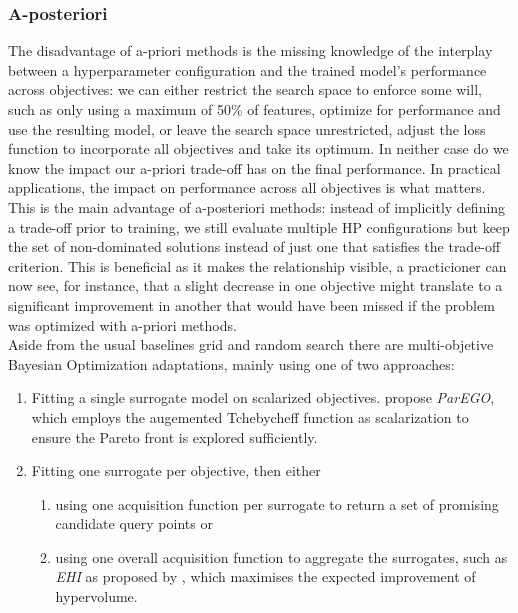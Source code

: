 \documentclass[twoside,11pt]{article}
\begin{document}
\subsubsection{A-posteriori}
\label{sec-moo-post}
The disadvantage of a-priori methods is the missing knowledge of the interplay between a hyperparameter configuration and the trained model's
performance across objectives:
we can either restrict the search space to enforce some will, such as only using a maximum of 50\% of features, optimize for performance and use the
resulting model, or leave the search space unrestricted, adjust the loss function to incorporate all objectives and take its optimum.
In neither case do we know the impact our a-priori trade-off has on the final performance.
In practical applications, the impact on performance across all objectives is what matters.
This is the main advantage of a-posteriori methods: instead of implicitly defining a trade-off prior to training, we still evaluate multiple HP configurations
but keep the set of non-dominated solutions instead of just one that satisfies the trade-off criterion.
This is beneficial as it makes the relationship visible, a practicioner can now see, for instance, that a slight decrease in one objective might translate to
a significant improvement in another that would have been missed if the problem was optimized with a-priori methods.
\\
Aside from the usual baselines grid and random search there are multi-objetive Bayesian Optimization adaptations, mainly using one of two approaches:
\begin{enumerate}[label*=\arabic*.]
  \item Fitting a single surrogate model on scalarized objectives. \citet[pp. 54-56]{ParEGO} propose \textit{ParEGO}, which employs the augemented Tchebycheff function as
        scalarization to ensure the Pareto front is explored sufficiently.
  \item Fitting one surrogate per objective, then either 
  \begin{enumerate}[label*=\arabic*.]
    \item using one acquisition function per surrogate to return a set of promising candidate query points or
    \item using one overall acquisition function to aggregate the surrogates, such as \textit{EHI} as proposed by \citet[pp. 8f]{EHI}, which maximises
          the expected improvement of hypervolume.
  \end{enumerate}
\end{enumerate}
\end{document}
